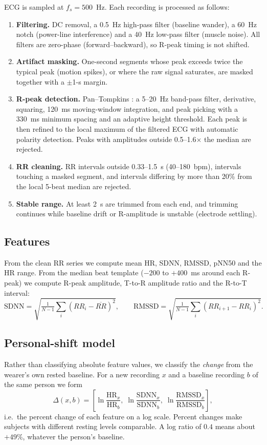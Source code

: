 \documentclass[11pt]{article}
\begin{document}
ECG is sampled at $f_s = 500$~Hz. Each recording is processed as follows:
\begin{enumerate}
  \item \textbf{Filtering.} DC removal, a 0.5~Hz high-pass filter (baseline wander), a 60~Hz notch
  (power-line interference) and a 40~Hz low-pass filter (muscle noise). All filters are zero-phase
  (forward--backward), so R-peak timing is not shifted.
  \item \textbf{Artifact masking.} One-second segments whose peak exceeds twice the typical peak
  (motion spikes), or where the raw signal saturates, are masked together with a $\pm$1-s margin.
  \item \textbf{R-peak detection.} Pan--Tompkins \cite{pantompkins1985}: a 5--20~Hz band-pass filter,
  derivative, squaring, 120~ms moving-window integration, and peak picking with a 330~ms minimum spacing
  and an adaptive height threshold. Each peak is then refined to the local maximum of the filtered ECG with
  automatic polarity detection. Peaks with amplitudes outside 0.5--1.6$\times$ the median are rejected.
  \item \textbf{RR cleaning.} RR intervals outside 0.33--1.5~s (40--180~bpm), intervals touching a masked
  segment, and intervals differing by more than 20\% from the local 5-beat median are rejected.
  \item \textbf{Stable range.} At least 2~s are trimmed from each end, and trimming continues while
  baseline drift or R-amplitude is unstable (electrode settling).
\end{enumerate}

\subsection{Features}
From the clean RR series we compute mean HR, SDNN, RMSSD, pNN50 and the HR range. From the median beat
template ($-200$ to $+400$~ms around each R-peak) we compute R-peak amplitude, T-to-R amplitude ratio and
the R-to-T interval:
\begin{equation}
\mathrm{SDNN} = \sqrt{\tfrac{1}{N-1}\textstyle\sum_{i}\left(RR_i-\overline{RR}\right)^2},\qquad
\mathrm{RMSSD} = \sqrt{\tfrac{1}{N-1}\textstyle\sum_{i}\left(RR_{i+1}-RR_i\right)^2}.
\end{equation}

\subsection{Personal-shift model}
\label{sec:shift}
Rather than classifying absolute feature values, we classify the \emph{change} from the wearer's own
rested baseline. For a new recording $x$ and a baseline recording $b$ of the same person we form
\begin{equation}
\Delta(x,b) = \left[\ln\frac{\mathrm{HR}_x}{\mathrm{HR}_b},\;
\ln\frac{\mathrm{SDNN}_x}{\mathrm{SDNN}_b},\;
\ln\frac{\mathrm{RMSSD}_x}{\mathrm{RMSSD}_b}\right],
\end{equation}
i.e.\ the percent change of each feature on a log scale. Percent changes make subjects with different
resting levels comparable. A log ratio of $0.4$ means about $+49\%$, whatever the person's baseline.
\end{document}
